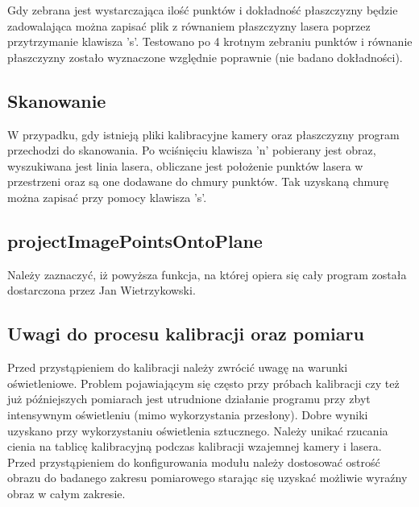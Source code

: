 \documentclass[conference]{IEEEtran}
\begin{document}
Gdy zebrana jest wystarczająca ilość punktów i dokładność płaszczyzny będzie zadowalająca można zapisać plik z równaniem płaszczyzny lasera poprzez przytrzymanie klawisza 's'.
Testowano po 4 krotnym zebraniu punktów i równanie płaszczyzny zostało wyznaczone względnie poprawnie (nie badano dokładności).

\subsection{Skanowanie}

W przypadku, gdy istnieją pliki kalibracyjne kamery oraz płaszczyzny program przechodzi do skanowania. Po wciśnięciu klawisza 'n' pobierany jest obraz, wyszukiwana jest linia lasera, obliczane jest położenie punktów lasera w przestrzeni oraz są one dodawane do chmury punktów. Tak uzyskaną chmurę można zapisać przy pomocy klawisza 's'.

\subsection{projectImagePointsOntoPlane}

Należy zaznaczyć, iż powyższa funkcja, na której opiera się cały program została dostarczona przez Jan Wietrzykowski.

\subsection{Uwagi do procesu kalibracji oraz pomiaru}

Przed przystąpieniem do kalibracji należy zwrócić uwagę na warunki oświetleniowe. Problem pojawiającym się często przy próbach kalibracji czy też już późniejszych pomiarach jest utrudnione działanie programu przy zbyt intensywnym oświetleniu (mimo wykorzystania przesłony). Dobre wyniki uzyskano przy wykorzystaniu oświetlenia sztucznego. Należy unikać rzucania cienia na tablicę kalibracyjną podczas kalibracji wzajemnej kamery i lasera. Przed przystąpieniem do konfigurowania modułu należy dostosować ostrość obrazu do badanego zakresu pomiarowego starając się uzyskać możliwie wyraźny obraz w całym zakresie.
\end{document}
